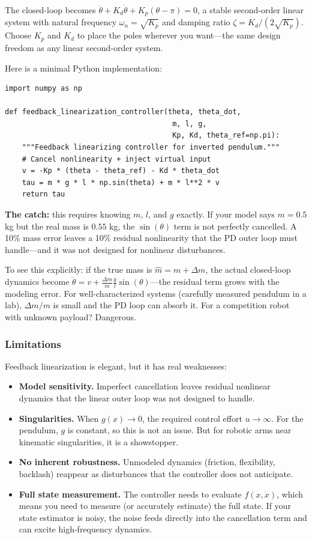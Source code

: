 The closed-loop becomes $\ddot{\theta} + K_d \dot{\theta} + K_p(\theta - \pi) = 0$, a stable second-order linear system with natural frequency $\omega_n = \sqrt{K_p}$ and damping ratio $\zeta = K_d / (2\sqrt{K_p})$. Choose $K_p$ and $K_d$ to place the poles wherever you want---the same design freedom as any linear second-order system.

Here is a minimal Python implementation:

\begin{verbatim}
import numpy as np

def feedback_linearization_controller(theta, theta_dot,
                                       m, l, g,
                                       Kp, Kd, theta_ref=np.pi):
    """Feedback linearizing controller for inverted pendulum."""
    # Cancel nonlinearity + inject virtual input
    v = -Kp * (theta - theta_ref) - Kd * theta_dot
    tau = m * g * l * np.sin(theta) + m * l**2 * v
    return tau
\end{verbatim}

\textbf{The catch:} this requires knowing $m$, $l$, and $g$ exactly. If your model says $m = 0.5$ kg but the real mass is $0.55$ kg, the $\sin(\theta)$ term is not perfectly cancelled. A 10\% mass error leaves a 10\% residual nonlinearity that the PD outer loop must handle---and it was not designed for nonlinear disturbances.

To see this explicitly: if the true mass is $\hat{m} = m + \Delta m$, the actual closed-loop dynamics become $\ddot{\theta} = v + \frac{\Delta m}{m} \frac{g}{l}\sin(\theta)$---the residual term grows with the modeling error. For well-characterized systems (carefully measured pendulum in a lab), $\Delta m / m$ is small and the PD loop can absorb it. For a competition robot with unknown payload? Dangerous.

\subsubsection{Limitations}

Feedback linearization is elegant, but it has real weaknesses:

\begin{itemize}[nosep]
    \item \textbf{Model sensitivity.} Imperfect cancellation leaves residual nonlinear dynamics that the linear outer loop was not designed to handle.
    \item \textbf{Singularities.} When $g(x) \to 0$, the required control effort $u \to \infty$. For the pendulum, $g$ is constant, so this is not an issue. But for robotic arms near kinematic singularities, it is a showstopper.
    \item \textbf{No inherent robustness.} Unmodeled dynamics (friction, flexibility, backlash) reappear as disturbances that the controller does not anticipate.
    \item \textbf{Full state measurement.} The controller needs to evaluate $f(x, \dot{x})$, which means you need to measure (or accurately estimate) the full state. If your state estimator is noisy, the noise feeds directly into the cancellation term and can excite high-frequency dynamics.
\end{itemize}

